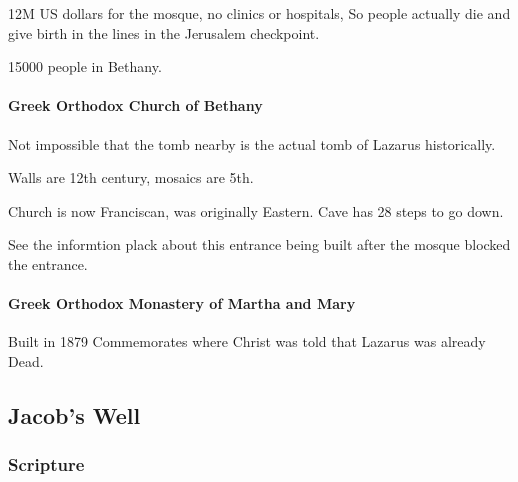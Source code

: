\documentclass[letterpaper]{report}
\begin{document}
12M US dollars for the mosque, no clinics or hospitals, So people actually die and give birth in the lines in the Jerusalem checkpoint.

15000 people in Bethany.

\paragraph{Greek Orthodox Church of Bethany}

Not impossible that the tomb nearby is the actual tomb of Lazarus historically.

Walls are 12th century, mosaics are 5th.

Church is now Franciscan, was originally Eastern.
Cave has 28 steps to go down.

See the informtion plack about this entrance being built after the mosque blocked the entrance.

\paragraph{Greek Orthodox Monastery of Martha and Mary}
Built in 1879
Commemorates where Christ was told that Lazarus was already Dead.

\clearpage
\subsection{Jacob's Well}
\begin{multicols}{2}
	\mbox{}
\end{multicols}
\subsubsection{Scripture}
\end{document}
